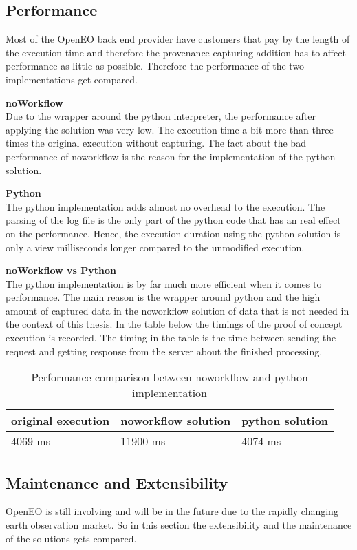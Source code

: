 \documentclass[draft,final]{vutinfth} %
\begin{document}
\subsection{Performance}\label{NvsP:Performance}
Most of the OpenEO back end provider have customers that pay by the length of the execution time and therefore the provenance capturing addition has to affect performance as little as possible. Therefore the performance of the two implementations get compared.

\textbf{noWorkflow} \\
Due to the wrapper around the python interpreter, the performance after applying the solution was very low. The execution time a bit more than three times the original execution without capturing. The fact about the bad performance of noworkflow is the reason for the implementation of the python solution. 

\textbf{Python} \\
The python implementation adds almost no overhead to the execution. The parsing of the log file is the only part of the python code that has an real effect on the performance. Hence, the execution duration using the python solution is only a view milliseconds longer compared to the unmodified execution.  

\textbf{noWorkflow vs Python} \\
The python implementation is by far much more efficient when it comes to performance. The main reason is the wrapper around python and the high amount of captured data in the noworkflow solution of data that is not needed in the context of this thesis. In the table below the timings of the proof of concept execution is recorded. The timing in the table is the time between sending the request and getting response from the server about the finished processing. 

\begin{table}[]
	\caption{Performance comparison between noworkflow and python implementation}
	\centering
	\begin{tabular}{l|l|l}
		\textbf{original execution} & \textbf{noworkflow solution} & \textbf{python solution} \\ \hline
		4069 ms & 11900 ms & 4074 ms \\ 
	\end{tabular}
	\label{Tab:noworkflow}
\end{table}

\subsection{Maintenance and Extensibility}\label{NvsP:Maintenance and Extensibility}
OpenEO is still involving and will be in the future due to the rapidly changing earth observation market. So in this section the extensibility and the maintenance of the solutions gets compared. 
\end{document}
